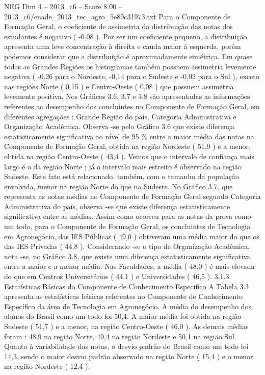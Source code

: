 \begin{textsample}{NEG Dim 4 – 2013\_c6 – Score 8.00 – 2013\_c6/enade\_2013\_tec\_agro\_5e89c31973.txt}
Para o Componente de Formação Geral, o coeficiente de assimetria da distribuição das notas dos estudantes é negativo ( -0,08 ).
Por ser um coeficiente pequeno, a distribuição apresenta uma leve concentração à direita e cauda maior à esquerda, porém podemos considerar que a distribuição é aproximadamente simétrica.
Em quase todas as Grandes Regiões os histogramas também possuem assimetria levemente negativa ( -0,26 para o Nordeste, -0,14 para o Sudeste e -0,02 para o Sul ), exceto nas regiões Norte ( 0,15 ) e Centro-Oeste ( 0,08 ) que possuem assimetria levemente positiva.
Nos Gráficos 3.6, 3.7 e 3.8 são apresentadas as informações referentes ao desempenho dos concluintes no Componente de Formação Geral, em diferentes agregações : Grande Região do país, Categoria Administrativa e Organização Acadêmica.
Observa -se pelo Gráfico 3.6 que existe diferença estatisticamente significativa ao nível de 95 \% entre a maior média das notas na Componente de Formação Geral, obtida na região Nordeste ( 51,9 ) e a menor, obtida na região Centro-Oeste ( 43,4 ).
Vemos que o intervalo de confiança mais largo é o da região Norte ; já o intervalo mais estreito é observado na região Sudeste.
Este fato está relacionado, também, com o tamanho da população envolvida, menor na região Norte do que na Sudeste.
No Gráfico 3.7, que representa as notas médias no Componente de Formação Geral segundo Categoria Administrativa do país, observa -se que existe diferença estatisticamente significativa entre as médias.
Assim como ocorreu para as notas da prova como um todo, para o Componente de Formação Geral, os concluintes de Tecnologia em Agronegócio, das IES Públicas ( 49,0 ) obtiveram uma média maior do que os das IES Privadas ( 44,8 ).
Considerando -se o tipo de Organização Acadêmica, nota -se, no Gráfico 3.8, que existe uma diferença estatisticamente significativa entre a maior e a menor média.
Nas Faculdades, a média ( 48,0 ) é mais elevada do que em Centros Universitários ( 44,1 ) e Universidades ( 46,5 ). 3.1.3 Estatísticas Básicas do Componente de Conhecimento Específico A Tabela 3.3 apresenta as estatísticas básicas referentes ao Componente de Conhecimento Específico da área de Tecnologia em Agronegócio.
A média do desempenho dos alunos do Brasil como um todo foi 50,4.
A maior média foi obtida na região Sudeste ( 51,7 ) e a menor, na região Centro-Oeste ( 46,0 ).
As demais médias foram : 48,9 na região Norte, 49,4 na região Nordeste e 50,1 na região Sul.
Quanto à variabilidade das notas, o desvio padrão do Brasil como um todo foi 14,3, sendo o maior desvio padrão observado na região Norte ( 15,4 ) e o menor na região Nordeste ( 12,4 ).

\end{textsample}
